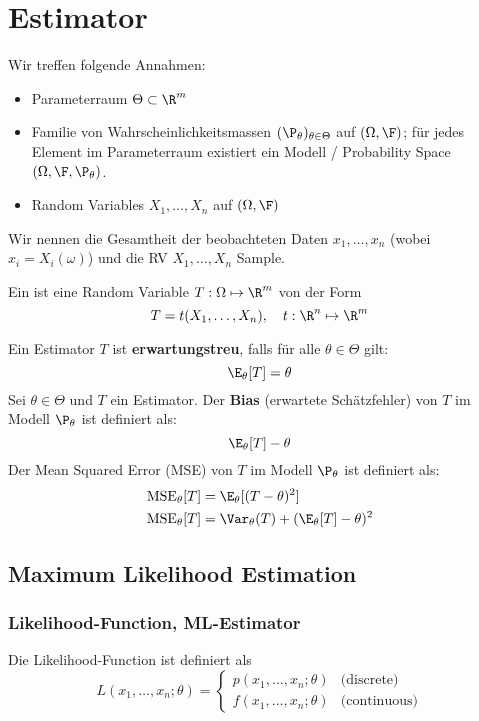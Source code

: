 \section{Estimator}

Wir treffen folgende Annahmen:
\begin{itemize}
	\item Parameterraum \(\Theta \subset \R^m\)
	\item Familie von Wahrscheinlichkeitsmassen \((\P_\theta)_{\theta \in \Theta}\) auf \((\Omega, \F)\); 
    für jedes Element im Parameterraum existiert ein Modell / Probability Space $(\Omega, \F, \P_{\theta})$.
	\item Random Variables \(X_1, \ldots, X_n\) auf \((\Omega, \F)\)
\end{itemize}
Wir nennen die Gesamtheit der beobachteten Daten \(x_1, \ldots, x_n\) (wobei $x_i = X_i(\omega)$) und die RV \(X_1, \ldots, X_n\) Sample.
\begin{mainbox}{}
	Ein  ist eine Random Variable \(T: \Omega \mapsto \R^m\) von der Form
	\[T = t(X_1, \ldots, X_n), \quad t: \R^n \mapsto \R^m\]
\end{mainbox}
Ein Estimator \(T\) ist \textbf{erwartungstreu}, falls für alle \(\theta \in \Theta\) gilt:
\[\E_\theta [T] = \theta\]
Sei \(\theta \in \Theta\) und \(T\) ein Estimator. Der \textbf{Bias} (erwartete Schätzfehler) von \(T\) im Modell \(\P_\theta\) ist definiert als:
\[\E_\theta[T]-\theta\]
Der Mean Squared Error (MSE) von \(T\) im Modell \(\P_\theta\) ist definiert als:
\begin{align*}
	\text{MSE}_\theta[T] & = \E_\theta[(T-\theta)^2]                    \\
	\text{MSE}_\theta[T] & = \Var_\theta(T) + (\E_\theta[T] - \theta)^2
\end{align*}

\subsection{Maximum Likelihood Estimation}
\subsubsection{Likelihood-Function, ML-Estimator}
Die Likelihood-Function ist definiert als
\[L(x_1, \ldots, x_n; \theta) = \begin{cases}
		p(x_1, \ldots, x_n; \theta) & \text{(discrete)} \\
		f(x_1, \ldots, x_n; \theta) & \text{(continuous)}
	\end{cases} \]

